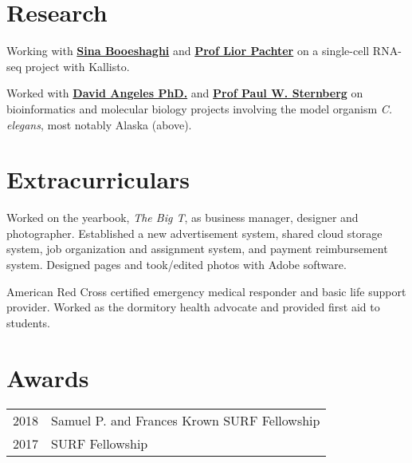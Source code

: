 \documentclass[]{resume}
\begin{document}
\begin{minipage}[t]{0.66\textwidth}
\section{Research}
Working with \textbf{\href{https://github.com/sbooeshaghi}{Sina Booeshaghi}} and \textbf{\href{https://liorpachter.wordpress.com/}{Prof Lior Pachter}} on a single-cell RNA-seq project with Kallisto.
\sectionsep

Worked with \textbf{\href{https://dangeles.github.io/}{David Angeles PhD.}} and \textbf{\href{http://wormlab.caltech.edu/LabMembers/Paul}{Prof Paul W. Sternberg}} on bioinformatics and molecular biology projects involving the model organism \textit{C. elegans}, most notably Alaska (above).
\sectionsep


\section{Extracurriculars}
Worked on the yearbook, \textit{The Big T}, as business manager, designer and photographer. Established a new advertisement system, shared cloud storage system, job organization and assignment system, and payment reimbursement system. Designed pages and took/edited photos with Adobe software.
\sectionsep

American Red Cross certified emergency medical responder and basic life support provider. Worked as the dormitory health advocate and provided first aid to students.
\sectionsep


\section{Awards}
\begin{tabular}{rl}
2018     & Samuel P. and Frances Krown SURF Fellowship  \\
2017     & SURF Fellowship \\
\end{tabular}
\sectionsep


% 
% 

\end{minipage}
\end{document}
